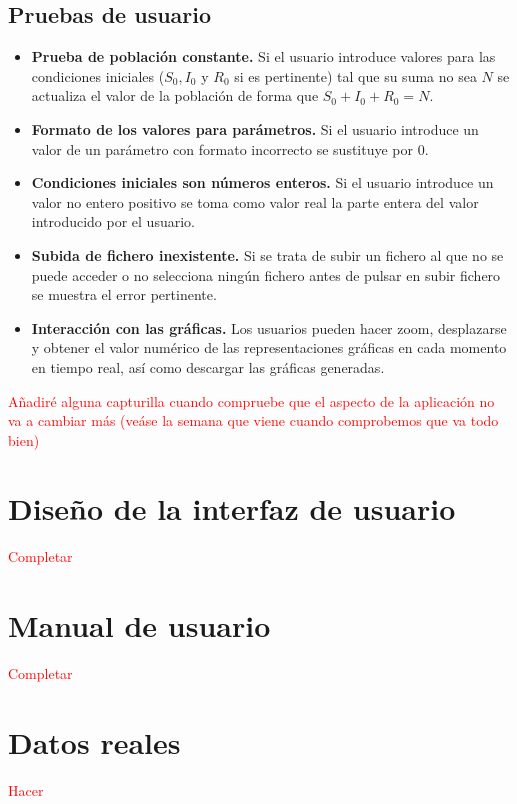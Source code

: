 \subsection{Pruebas de usuario}

\begin{itemize}
\item \textbf{Prueba de población constante.} Si el usuario introduce valores para las condiciones iniciales ($S_0, I_0$ y $R_0$ si es pertinente) tal que su suma no sea $N$ se actualiza el valor de la población de forma que $S_0+I_0+R_0=N$.
\item \textbf{Formato de los valores para parámetros.} Si el usuario introduce un valor de un parámetro con formato incorrecto se sustituye por $0$.
\item \textbf{Condiciones iniciales son números enteros.} Si el usuario introduce un valor no entero positivo se toma como valor real la parte entera del valor introducido por el usuario.
\item \textbf{Subida de fichero inexistente.} Si se trata de subir un fichero al que no se puede acceder o no selecciona ningún fichero antes de pulsar en subir fichero se muestra el error pertinente.
\item \textbf{Interacción con las gráficas.} Los usuarios pueden hacer zoom, desplazarse y obtener el valor numérico de las representaciones gráficas en cada momento en tiempo real, así como descargar las gráficas generadas.
\end{itemize}

\textcolor{red}{Añadiré alguna capturilla cuando compruebe que el aspecto de la aplicación no va a cambiar más (veáse la semana que viene cuando comprobemos que va todo bien)}

\section{Diseño de la interfaz de usuario}

\textcolor{red}{Completar}

\section{Manual de usuario}

\textcolor{red}{Completar}

\section{Datos reales}

\textcolor{red}{Hacer}



















